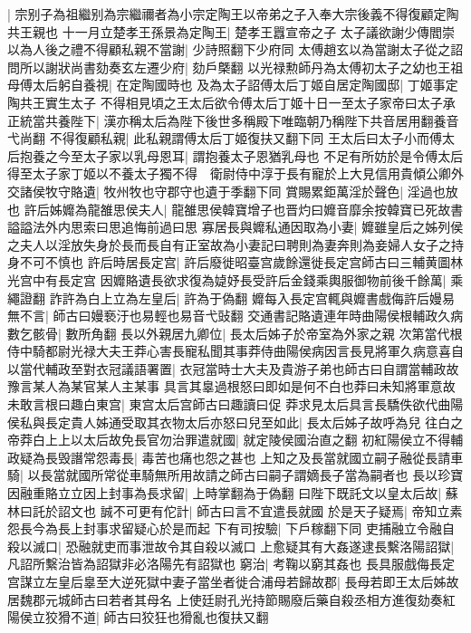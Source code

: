 |{
	宗别子為祖繼别為宗繼禰者為小宗定陶王以帝弟之子入奉大宗後義不得復顧定陶共王親也}
十一月立楚孝王孫景為定陶王|{
	楚孝王囂宣帝之子}
太子議欲謝少傳閻崇以為人後之禮不得顧私親不當謝|{
	少詩照翻下少府同}
太傅趙玄以為當謝太子從之詔問所以謝狀尚書劾奏玄左遷少府|{
	劾戶槩翻}
以光禄勲師丹為太傅初太子之幼也王祖母傅太后躬自養視|{
	在定陶國時也}
及為太子詔傅太后丁姬自居定陶國邸|{
	丁姬事定陶共王實生太子}
不得相見頃之王太后欲令傅太后丁姬十日一至太子家帝曰太子承正統當共養陛下|{
	漢亦稱太后為陛下後世多稱殿下唯臨朝乃稱陛下共音居用翻養音弋尚翻}
不得復顧私親|{
	此私親謂傅太后丁姬復扶又翻下同}
王太后曰太子小而傅太后抱養之今至太子家以乳母恩耳|{
	謂抱養太子恩猶乳母也}
不足有所妨於是令傅太后得至太子家丁姬以不養太子獨不得　衛尉侍中淳于長有寵於上大見信用貴傾公卿外交諸侯牧守賂遺|{
	牧州牧也守郡守也遺于季翻下同}
賞賜累鉅萬淫於聲色|{
	淫過也放也}
許后姊孊為龍雒思侯夫人|{
	龍雒思侯韓寶增子也晋灼曰孊音靡余按韓寶已死故書謚謚法外内思索曰思追悔前過曰思}
寡居長與孊私通因取為小妻|{
	孊雖皇后之姊列侯之夫人以淫放失身於長而長自有正室故為小妻記曰聘則為妻奔則為妾婦人女子之持身不可不慎也}
許后時居長定宫|{
	許后廢徙昭臺宫歲餘還徙長定宫師古曰三輔黄圖林光宫中有長定宫}
因孊賂遺長欲求復為媫妤長受許后金錢乘輿服御物前後千餘萬|{
	乘繩證翻}
詐許為白上立為左皇后|{
	許為于偽翻}
孊每入長定宫輒與孊書戲侮許后嫚易無不言|{
	師古曰嫚䙝汙也易輕也易音弋䜴翻}
交通書記賂遺連年時曲陽侯根輔政久病數乞骸骨|{
	數所角翻}
長以外親居九卿位|{
	長太后姊子於帝室為外家之親}
次第當代根侍中騎都尉光禄大夫王莽心害長寵私聞其事莽侍曲陽侯病因言長見將軍久病意喜自以當代輔政至對衣冠議語署置|{
	衣冠當時士大夫及貴游子弟也師古曰自謂當輔政故豫言某人為某官某人主某事}
具言其辠過根怒曰即如是何不白也莽曰未知將軍意故未敢言根曰趣白東宫|{
	東宫太后宫師古曰趣讀曰促}
莽求見太后具言長驕佚欲代曲陽侯私與長定貴人姊通受取其衣物太后亦怒曰兒至如此|{
	長太后姊子故呼為兒}
往白之帝莽白上上以太后故免長官勿治罪遣就國|{
	就定陵侯國治直之翻}
初紅陽侯立不得輔政疑為長毁譖常怨毒長|{
	毒苦也痛也怨之甚也}
上知之及長當就國立嗣子融從長請車騎|{
	以長當就國所常從車騎無所用故請之師古曰嗣子謂嫡長子當為嗣者也}
長以珍寶因融重賂立立因上封事為長求留|{
	上時掌翻為于偽翻}
曰陛下既託文以皇太后故|{
	蘇林曰託於詔文也}
誠不可更有佗計|{
	師古曰言不宜遣長就國}
於是天子疑焉|{
	帝知立素怨長今為長上封事求留疑心於是而起}
下有司按驗|{
	下戶稼翻下同}
吏捕融立令融自殺以滅口|{
	恐融就吏而事泄故令其自殺以滅口}
上愈疑其有大姦遂逮長繫洛陽詔獄|{
	凡詔所繫治皆為詔獄非必洛陽先有詔獄也}
窮治|{
	考鞠以窮其姦也}
長具服戲侮長定宫謀立左皇后辠至大逆死獄中妻子當坐者徙合浦母若歸故郡|{
	長母若即王太后姊故居魏郡元城師古曰若者其母名}
上使廷尉孔光持節賜廢后藥自殺丞相方進復劾奏紅陽侯立狡猾不道|{
	師古曰狡狂也猾亂也復扶又翻}
